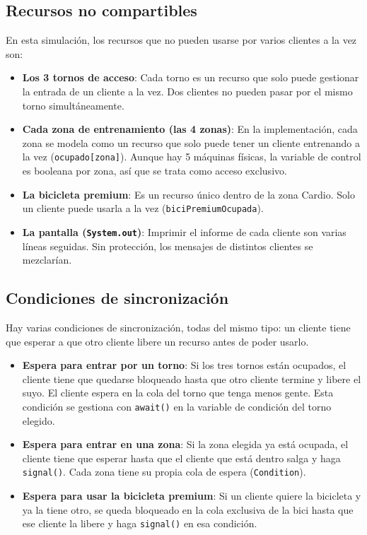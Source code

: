 \documentclass[12pt,a4paper]{article}
\begin{document}
\subsection{Recursos no compartibles}

En esta simulación, los recursos que no pueden usarse por varios clientes a la vez son:
\begin{itemize}
  \item \textbf{Los 3 tornos de acceso}: Cada torno es un recurso que solo puede gestionar la entrada de un cliente a la vez. Dos clientes no pueden pasar por el mismo torno simultáneamente.
  \item \textbf{Cada zona de entrenamiento (las 4 zonas)}: En la implementación, cada zona se modela como un recurso que solo puede tener un cliente entrenando a la vez (\texttt{ocupado[zona]}). Aunque hay 5 máquinas físicas, la variable de control es booleana por zona, así que se trata como acceso exclusivo.
  \item \textbf{La bicicleta premium}: Es un recurso único dentro de la zona Cardio. Solo un cliente puede usarla a la vez (\texttt{biciPremiumOcupada}).
  \item \textbf{La pantalla (\texttt{System.out})}: Imprimir el informe de cada cliente son varias líneas seguidas. Sin protección, los mensajes de distintos clientes se mezclarían.
\end{itemize}

\subsection{Condiciones de sincronización}

Hay varias condiciones de sincronización, todas del mismo tipo: un cliente tiene que esperar a que otro cliente libere un recurso antes de poder usarlo.
\begin{itemize}
  \item \textbf{Espera para entrar por un torno}: Si los tres tornos están ocupados, el cliente tiene que quedarse bloqueado hasta que otro cliente termine y libere el suyo. El cliente espera en la cola del torno que tenga menos gente. Esta condición se gestiona con \texttt{await()} en la variable de condición del torno elegido.
  \item \textbf{Espera para entrar en una zona}: Si la zona elegida ya está ocupada, el cliente tiene que esperar hasta que el cliente que está dentro salga y haga \texttt{signal()}. Cada zona tiene su propia cola de espera (\texttt{Condition}).
  \item \textbf{Espera para usar la bicicleta premium}: Si un cliente quiere la bicicleta y ya la tiene otro, se queda bloqueado en la cola exclusiva de la bici hasta que ese cliente la libere y haga \texttt{signal()} en esa condición.
\end{itemize}
\end{document}
